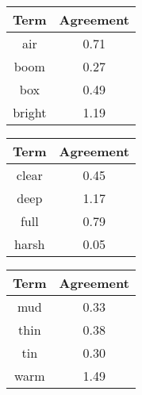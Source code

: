 \begin{tabular}{|c|c|}
	\hline
	\bf{Term} & \bf{Agreement} \tabularnewline
	\hline
	\hline
	air & 0.71 \tabularnewline
	\hline
	boom & 0.27 \tabularnewline
	\hline
	box & 0.49 \tabularnewline
	\hline
	bright & 1.19 \tabularnewline
	\hline
\end{tabular}
\qquad
\begin{tabular}{|c|c|}
	\hline
	\bf{Term} & \bf{Agreement} \tabularnewline
	\hline
	\hline
	clear & 0.45 \tabularnewline
	\hline
	deep & 1.17 \tabularnewline
	\hline
	full & 0.79 \tabularnewline
	\hline
	harsh & 0.05 \tabularnewline
	\hline
\end{tabular}
\qquad
\begin{tabular}{|c|c|}
	\hline
	\bf{Term} & \bf{Agreement} \tabularnewline
	\hline
	\hline
	mud & 0.33 \tabularnewline
	\hline
	thin & 0.38 \tabularnewline
	\hline
	tin & 0.30 \tabularnewline
	\hline
	warm & 1.49 \tabularnewline
	\hline
\end{tabular}
